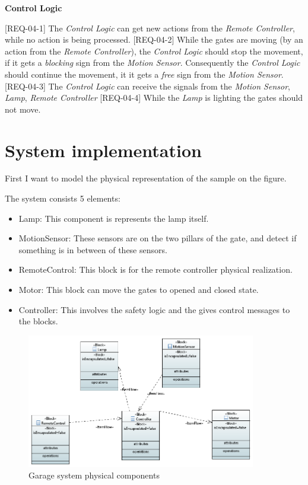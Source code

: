 \textbf{Control Logic}

[REQ-04-1] The \textit{Control Logic} can get new actions from the \textit{Remote Controller}, while no action is being processed.
[REQ-04-2] While the gates are moving (by an action from the \textit{Remote Controller}), the \textit{Control Logic} should stop the movement, if it gets a \textit{blocking} sign from the \textit{Motion Sensor}. Consequently the \textit{Control Logic} should continue the movement, it it gets a \textit{free} sign from the \textit{Motion Sensor}.
[REQ-04-3] The \textit{Control Logic} can receive the signals from the \textit{Motion Sensor}, \textit{Lamp}, \textit{Remote Controller}
[REQ-04-4] While the \textit{Lamp} is lighting the gates should not move.

\section{System implementation}

First I want to model the physical representation of the sample on the  figure.

The system consists 5 elements:
\begin{itemize}
	\item Lamp: This component is represents the lamp itself.
	\item MotionSensor: These sensors are on the two pillars of the gate, and detect if something is in between of these sensors.
	\item RemoteControl: This block is for the remote controller physical realization.
    \item Motor: This block can move the gates to opened and closed state.
    \item Controller: This involves the safety logic and the gives control messages to the blocks.
\end{itemize}

\begin{figure}[!ht]
	\centering
	\includegraphics[width=100mm, keepaspectratio]{figures/BDDgarageSystem.png}
	\caption{Garage system physical components}
	\label{fig:GarageBDD}
\end{figure}

